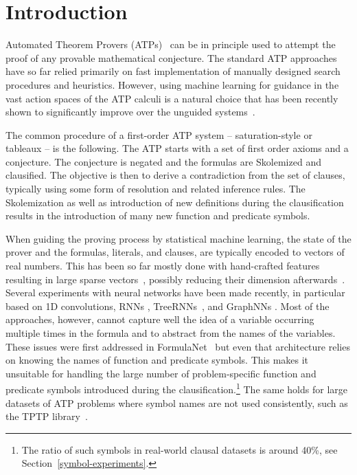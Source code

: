 \documentclass{ecai}
\begin{document}
%

\section{Introduction}

Automated Theorem Provers (ATPs)~\cite{DBLP:books/el/RobinsonV01} can be in principle
used to attempt the proof of any provable mathematical conjecture. 
The standard ATP approaches have
so far relied primarily on fast implementation of manually designed search procedures and heuristics.
However, using machine learning for guidance in the vast action spaces of the ATP calculi is a
natural choice that has been recently shown to significantly improve over the 
unguided systems~\cite{KaliszykUMO18,JakubuvU19}.

The common procedure of a first-order ATP system -- saturation-style
or tableaux -- is the following. The ATP starts with a set of first
order axioms and a conjecture. The conjecture is negated and the
formulas are Skolemized and clausified.
The objective is then to derive a contradiction from the set of clauses,
typically using some form of resolution and related inference rules.
The Skolemization as well as introduction of new definitions during
the clausification results in the introduction of many new function and predicate
symbols.

When guiding the proving process by statistical machine learning, 
the state of the prover and the
formulas, literals, and clauses, are typically encoded  to vectors of
real numbers. This has been so far mostly done with hand-crafted features resulting
in large sparse vectors~\cite{DBLP:conf/ijcai/KaliszykUV15,hammers4qed,abs-1108-3446,UrbanVS11,KaliszykU15,JakubuvU17a}, possibly reducing their dimension afterwards~\cite{ChvalovskyJ0U19}. 
Several experiments with neural
networks have been made recently, in particular based on 1D convolutions,
RNNs \cite{GollerK96}, TreeRNNs~\cite{ChvalovskyJ0U19}, and GraphNNs \cite{DuvenaudMABHAA15}. Most of the approaches, however, cannot
capture well the idea of a variable occurring multiple times in the
formula and to abstract from the names of the variables.
These issues were first 
addressed in FormulaNet~\cite{DBLP:conf/nips/WangTWD17} but even that
architecture relies on knowing the names of function and predicate symbols. This makes it 
unsuitable for handling the large number of problem-specific function and predicate
symbols introduced during the clausification.\footnote{The ratio of such symbols in real-world clausal datasets is around 40\%, see Section~\ref{symbol-experiments}.}
The same holds for large datasets of ATP problems
where symbol names are not used consistently, such as the TPTP library~\cite{Sutcliffe10}.
\end{document}
